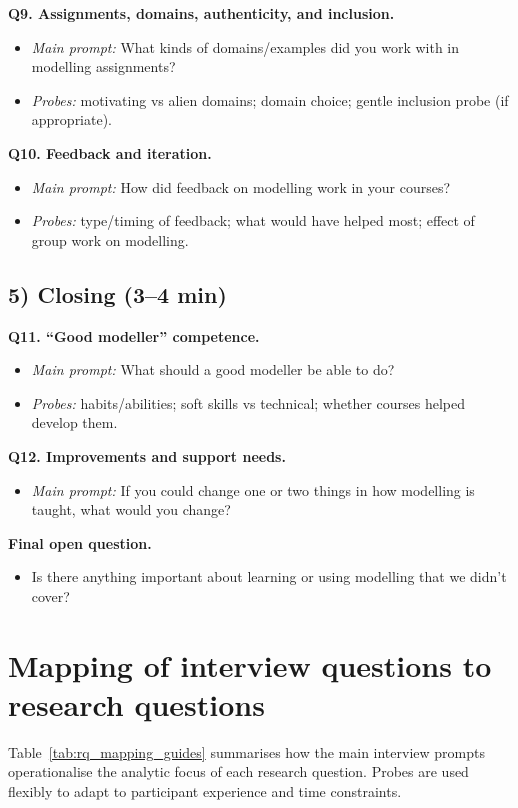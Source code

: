 \textbf{Q9. Assignments, domains, authenticity, and inclusion.}
\begin{itemize}
  \item \emph{Main prompt:} What kinds of domains/examples did you work with in modelling assignments?
  \item \emph{Probes:} motivating vs alien domains; domain choice; gentle inclusion probe (if appropriate).
\end{itemize}

\textbf{Q10. Feedback and iteration.}
\begin{itemize}
  \item \emph{Main prompt:} How did feedback on modelling work in your courses?
  \item \emph{Probes:} type/timing of feedback; what would have helped most; effect of group work on modelling.
\end{itemize}

\subsection*{5) Closing (3--4 min)}
\textbf{Q11. “Good modeller” competence.}
\begin{itemize}
  \item \emph{Main prompt:} What should a good modeller be able to do?
  \item \emph{Probes:} habits/abilities; soft skills vs technical; whether courses helped develop them.
\end{itemize}

\textbf{Q12. Improvements and support needs.}
\begin{itemize}
  \item \emph{Main prompt:} If you could change one or two things in how modelling is taught, what would you change?
\end{itemize}

\textbf{Final open question.}
\begin{itemize}
  \item Is there anything important about learning or using modelling that we didn’t cover?
\end{itemize}

\section{Mapping of interview questions to research questions}
\label{app:rq_mapping}

Table~\ref{tab:rq_mapping_guides} summarises how the main interview prompts operationalise the analytic focus of each research question. Probes are used flexibly to adapt to participant experience and time constraints.


